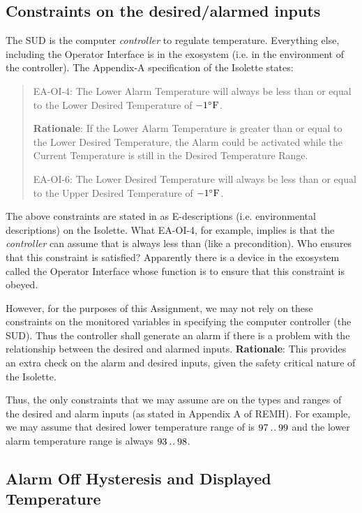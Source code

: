 \subsection{Constraints on the desired/alarmed inputs}

The SUD is the computer \emph{controller} to regulate temperature. Everything else, including the Operator Interface is in the exosystem (i.e. in the environment of the controller).  The Appendix-A specification of the Isolette \cite[pA-11]{REMH} states:

\begin{quote}
EA-OI-4: The Lower Alarm Temperature will always be less than or equal to the Lower Desired Temperature of $-1^{\circ}\mathrm{F}$.

\textbf{Rationale}: If the Lower Alarm Temperature is greater than or equal to the Lower Desired Temperature, the Alarm could be activated while the Current Temperature is still in the Desired Temperature Range.

EA-OI-6: The Lower Desired Temperature will always be less than or equal to the Upper Desired Temperature of  $-1^{\circ}\mathrm{F}$.
\end{quote}

The above constraints are stated in \cite{REMH}  as E-descriptions (i.e. environmental descriptions) on the Isolette. What EA-OI-4, for example, implies is that the \emph{controller} can assume that  is always less than   (like a precondition). Who ensures that this constraint is satisfied? Apparently there is a device in the exosystem called the Operator Interface whose function is to ensure that this constraint is obeyed.

However, for the purposes of this Assignment, we may not rely on these constraints on the monitored variables in specifying the computer controller (the SUD). Thus the controller shall generate an alarm if there is a problem with the relationship between the desired and alarmed inputs. \textbf{Rationale}: This provides an extra check on the alarm and desired inputs, given the safety critical nature of the Isolette.

Thus, the only constraints that we may assume are on the types and ranges of the desired and alarm inputs (as stated in Appendix A of REMH). For example, we may assume that desired lower temperature range of  is $97\mathbin{.\mkern1mu.} 99$ and the lower alarm temperature range is always $93\mathbin{.\mkern1mu.} 98$.

\subsection{Alarm Off Hysteresis and Displayed Temperature}

